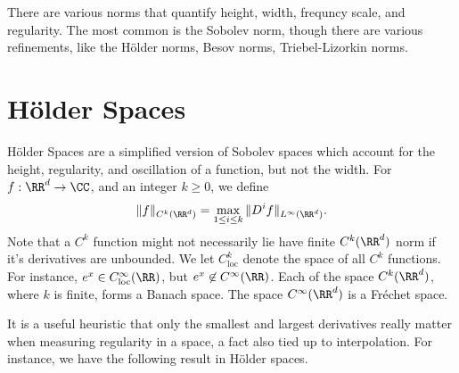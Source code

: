 %
There are various norms that quantify height, width, frequncy scale, and regularity. The most common is the Sobolev norm, though there are various refinements, like the H\"{o}lder norms, Besov norms, Triebel-Lizorkin norms.

\section{H\"{o}lder Spaces}

H\"{o}lder Spaces are a simplified version of Sobolev spaces which account for the height, regularity, and oscillation of a function, but not the width. For $f: \RR^d \to \CC$, and an integer $k \geq 0$, we define
%
\[ \| f \|_{C^k(\RR^d)} = \max_{1 \leq i \leq k} \| D^i f \|_{L^\infty(\RR^d)}. \]
%
Note that a $C^k$ function might not necessarily lie have finite $C^k(\RR^d)$ norm if it's derivatives are unbounded. We let $C^k_{\text{loc}}$ denote the space of all $C^k$ functions. For instance, $e^x \in C^\infty_\text{loc}(\RR)$, but $e^x \not \in C^\infty(\RR)$. Each of the space $C^k(\RR^d)$, where $k$ is finite, forms a Banach space. The space $C^\infty(\RR^d)$ is a Fr\'{e}chet space.

It is a useful heuristic that only the smallest and largest derivatives really matter when measuring regularity in a space, a fact also tied up to interpolation. For instance, we have the following result in H\"{o}lder spaces.

